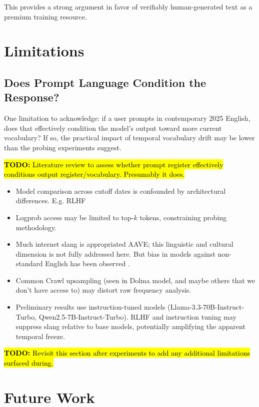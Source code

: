 \documentclass[11pt]{article}
\newcommand{\todo}[1]{\hl{\textbf{TODO:} #1}}
\begin{document}
This provides a strong argument in favor of verifiably human-generated text as a premium training resource.

\section{Limitations}

\subsection{Does Prompt Language Condition the Response?}

One limitation to acknowledge: if a user prompts in contemporary 2025 English, does that effectively condition the model's output toward more current vocabulary? If so, the practical impact of temporal vocabulary drift may be lower than the probing experiments suggest.

\todo{Literature review to assess whether prompt register effectively conditions output register/vocabulary. Presumably it does.}

\begin{itemize}
  \item Model comparison across cutoff dates is confounded by architectural differences. E.g. RLHF
  \item Logprob access may be limited to top-$k$ tokens, constraining probing methodology.
  \item Much internet slang is appropriated AAVE; this linguistic and cultural dimension is not fully addressed here. But bias in models against non-standard English has been observed \cite{barnhart2025rlhf}.
  \item Common Crawl upsampling (seen in Dolma model, and maybe others that we don't have access to) may distort raw frequency analysis.
  \item Preliminary results use instruction-tuned models
  (Llama-3.3-70B-Instruct-Turbo, Qwen2.5-7B-Instruct-Turbo). RLHF and instruction tuning may suppress slang relative to base models, potentially amplifying the apparent temporal freeze.
\end{itemize}

\todo{Revisit this section after experiments to add any additional limitations surfaced during.}

\section{Future Work}
\end{document}
